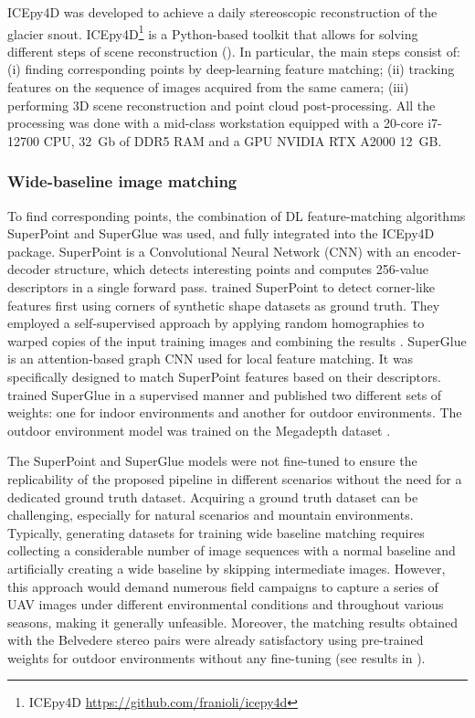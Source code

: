 ICEpy4D was developed to achieve a daily stereoscopic reconstruction of the glacier snout.
ICEpy4D\footnote{ICEpy4D \url{https://github.com/franioli/icepy4d}} is a Python-based toolkit that allows for solving different steps of scene reconstruction
(). 
In particular, the main steps consist of:
(i) finding corresponding points by deep-learning feature matching;
(ii) tracking features on the sequence of images acquired from the same camera;
(iii) performing 3D scene reconstruction and point cloud post-processing.
All the processing was done with a mid-class workstation equipped with a 20-core i7-12700 CPU, 32~Gb of DDR5 RAM and a GPU NVIDIA RTX A2000 12~GB.

\subsubsection{Wide-baseline image matching}\label{sec:4:matching}

To find corresponding points, the combination of DL feature-matching algorithms SuperPoint \citep{DeTone_2018} and SuperGlue \citep{sarlin2020superglue} was used, and
fully integrated into the ICEpy4D package.
SuperPoint is a Convolutional Neural Network (CNN) with an encoder-decoder structure, which detects interesting points and computes 256-value descriptors in a single forward pass.
\citet{DeTone_2018} trained SuperPoint to detect corner-like features first using corners of synthetic shape datasets as ground truth.
They employed a self-supervised approach by applying random homographies to warped copies of the input training images and combining the results \citep{DeTone_2018}.
SuperGlue is an attention-based graph CNN used for local feature matching.
It was specifically designed to match SuperPoint features based on their descriptors.
\citet{sarlin2020superglue} trained SuperGlue in a supervised manner and published two different sets of weights: one for indoor environments and another for outdoor environments.
The outdoor environment model was trained on the Megadepth dataset \citep{Li_Snavely_2018_MegaDepth}.

The SuperPoint and SuperGlue models were not fine-tuned to ensure the replicability of the proposed pipeline in different scenarios without the need for a dedicated ground truth dataset.
Acquiring a ground truth dataset can be challenging, especially for natural scenarios and mountain environments.
Typically, generating datasets for training wide baseline matching requires collecting a considerable number of image sequences with a normal baseline and artificially creating a wide baseline by skipping intermediate images.
However, this approach would demand numerous field campaigns to capture a series of UAV images under different environmental conditions and throughout various seasons, making it generally unfeasible.
Moreover, the matching results obtained with the Belvedere stereo pairs were already satisfactory using pre-trained weights for outdoor environments without any fine-tuning (see results in ).

